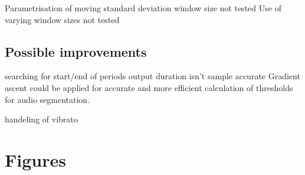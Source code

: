 \documentclass[titlepage]{scrartcl}
\begin{document}
Parametrisation of moving standard deviation window size not tested
Use of varying window sizes not tested

\subsection{Possible improvements}
searching for start/end of periods
output duration isn't sample accurate
Gradient ascent could be applied for accurate and more efficient calculation
of thresholds for audio segmentation.

handeling of vibrato

\section{Figures}

\printbibliography
\end{document}
